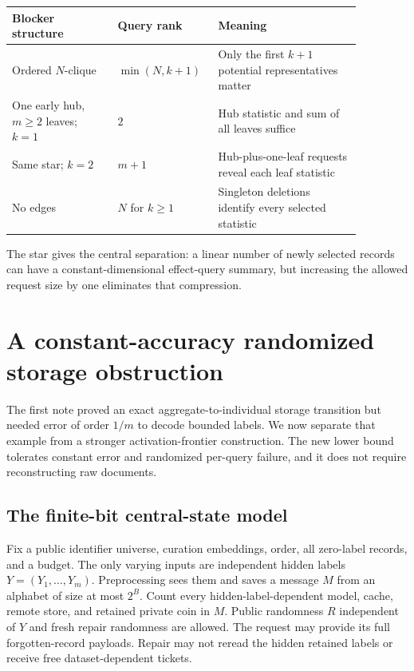 \documentclass[11pt,a4paper]{article}
\theoremstyle{definition}\newtheorem{definition}[theorem]{Definition}
\begin{document}
\begin{center}\small
\begin{tabular}{p{0.28\linewidth}p{0.21\linewidth}p{0.38\linewidth}}
\toprule
Blocker structure & Query rank & Meaning\\
\midrule
Ordered $N$-clique & $\min(N,k+1)$ & Only the first $k+1$ potential representatives matter\\
One early hub, $m\ge2$ leaves; $k=1$ & $2$ & Hub statistic and sum of all leaves suffice\\
Same star; $k=2$ & $m+1$ & Hub-plus-one-leaf requests reveal each leaf statistic\\
No edges & $N$ for $k\ge1$ & Singleton deletions identify every selected statistic\\
\bottomrule
\end{tabular}
\end{center}
The star gives the central separation: a linear number of newly selected records can have a constant-dimensional effect-query summary, but increasing the allowed request size by one eliminates that compression.

\section{A constant-accuracy randomized storage obstruction}\label{sec:phase}
The first note proved an exact aggregate-to-individual storage transition but needed error of order $1/m$ to decode bounded labels. We now separate that example from a stronger activation-frontier construction. The new lower bound tolerates constant error and randomized per-query failure, and it does not require reconstructing raw documents.

\subsection{The finite-bit central-state model}
Fix a public identifier universe, curation embeddings, order, all zero-label records, and a budget. The only varying inputs are independent hidden labels $Y=(Y_1,\ldots,Y_m)$. Preprocessing sees them and saves a message $M$ from an alphabet of size at most $2^B$. Count every hidden-label-dependent model, cache, remote store, and retained private coin in $M$. Public randomness $R$ independent of $Y$ and fresh repair randomness are allowed. The request may provide its full forgotten-record payloads. Repair may not reread the hidden retained labels or receive free dataset-dependent tickets.
\end{document}
